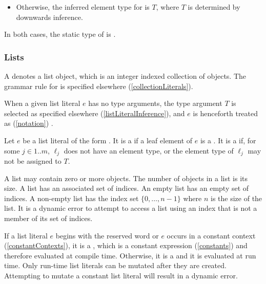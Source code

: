 \documentclass[makeidx]{article}
\begin{document}
{\begin{itemize}
\item
  Otherwise,
  the inferred element type for  is $T$,
  where $T$ is determined by downwards inference.
\end{itemize}

\LMHash{}%
In both cases, the static type of  is .


\subsubsection{Lists}

\LMHash{}%
A 
denotes a list object, which is an integer indexed collection of objects.
The grammar rule for  is specified elsewhere
(\ref{collectionLiterals}).

\LMHash{}%
When a given list literal $e$ has no type arguments,
the type argument $T$ is selected as specified elsewhere
(\ref{listLiteralInference}),
and $e$ is henceforth treated as
(\ref{notation})
.


\LMHash{}%
Let $e$ be a list literal of the form
.
It is a  if a leaf element of $e$ is a
.
It is a  if, for some $j \in 1 .. m$,
$\ell_j$ does not have an element type,
or the element type of $\ell_j$ may not be assigned to $T$.

\LMHash{}%
A list may contain zero or more objects.
The number of objects in a list is its size.
A list has an associated set of indices.
An empty list has an empty set of indices.
A non-empty list has the index set $\{0, \ldots, n - 1\}$
where $n$ is the size of the list.
It is a dynamic error to attempt to access a list
using an index that is not a member of its set of indices.


\LMHash{}%
If a list literal $e$ begins with the reserved word \CONST{}
or $e$ occurs in a constant context
(\ref{constantContexts}),
it is a
,
which is a constant expression
(\ref{constants})
and therefore evaluated at compile time.
Otherwise, it is a
and it is evaluated at run time.
Only run-time list literals can be mutated
after they are created.
Attempting to mutate a constant list literal will result in a dynamic error.

}
\end{document}
